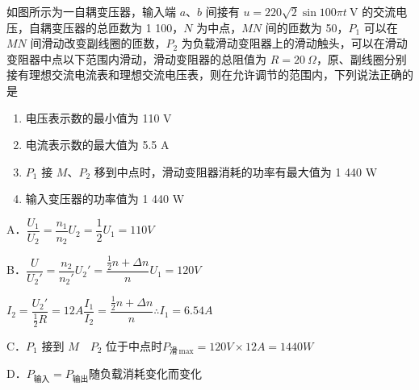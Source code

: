\begin{problem}
如图所示为一自耦变压器，输入端 $a$、$b$ 间接有 $u=220\sqrt{2}\sin 100\pi t\ \mathrm{V}$ 的交流电压，自耦变压器的总匝数为 1 100，$N$ 为中点，$MN$ 间的匝数为 50，$P_1$ 可以在 $MN$ 间滑动改变副线圈的匝数，$P_2$ 为负载滑动变阻器上的滑动触头，可以在滑动变阻器中点以下范围内滑动，滑动变阻器的总阻值为 $R=20\ \Omega$，原、副线圈分别接有理想交流电流表和理想交流电压表，则在允许调节的范围内，下列说法正确的是
\begin{enumerate}[label=\Alph*.,leftmargin=2em,itemsep=0pt]
\item 电压表示数的最小值为 110 V %
\item 电流表示数的最大值为 5.5 A
\item $P_1$ 接 $M$、$P_2$ 移到中点时，滑动变阻器消耗的功率有最大值为 1 440 W
\item 输入变压器的功率值为 1 440 W %
\end{enumerate}
\begin{solution}
A．$\dfrac{U_1}{U_2}=\dfrac{n_1}{n_2}$\qquad $U_2=\dfrac{1}{2}U_1=110\unit{V}$

B．$\dfrac{U}{U_2'}=\dfrac{n_2}{n_2'}$\qquad $U_2'=\dfrac{\frac{1}{2}n+\Delta n}{n}U_1=120\unit{V}$

$I_2=\dfrac{U_2'}{\frac{1}{2}R}=12\unit{A}$\qquad $\dfrac{I_1}{I_2}=\dfrac{\frac{1}{2}n+\Delta n}{n}$\qquad $\therefore I_1=6.54\unit{A}$

C．$P_1$ 接到 $M$　$P_2$ 位于中点时\quad $P_{\text{滑}\,\mathrm{max}}=120\unit{V}\times12\unit{A}=1440\unit{W}$

D．$P_{\text{输入}}=P_{\text{输出}}$\quad 随负载消耗变化而变化

\end{solution}
\end{problem}
